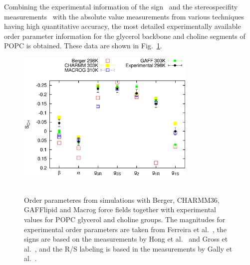 \documentclass[pre,aps,floatfix,authordate1-4,twocolumn]{revtex4-1}
\begin{document}
Combining the experimental information of the sign~\cite{hong95a,hong95b,gross97} and the stereospecifity 
measurements~\cite{gally81} with the absolute value measurements from various techniques~\cite{gally75,akutsu81,gross97,dvinskikh05a,ferreira13}
having high quantitative accuracy,
the most detailed experimentally available order parameter information for the glycerol backbone and choline segments of POPC is obtained.
These data are shown in Fig.~\ref{HGorderparameters2}.
\begin{figure}[]
  \centering
  \includegraphics[width=8.6cm]{HGorderparameters5.eps} \\
   \\
  \caption{\label{HGorderparameters2}
  Order parameteres from simulations with Berger, CHARMM36, GAFFlipid and Macrog force fields together with experimental values for POPC glycerol and choline groups.
  The magnitudes for experimental order parameters are taken from Ferreira et al.~\cite{ferreira13}, the signs are based on the measurements by Hong et al.~\cite{hong95a,hong95b} 
  and Gross et al.~\cite{gross97}, and the R/S labeling is based in the measurements by Gally et al.~\cite{gally81}.
} 
\end{figure}
\end{document}
